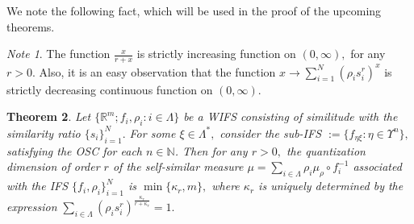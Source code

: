 \documentclass{amsproc}
\newtheorem{theorem}{Theorem}[section]
\theoremstyle{definition}
\theoremstyle{remark}
\newtheorem{note}[theorem]{Note}
\numberwithin{equation}{section}
\begin{document}
We note the following fact, which will be used in the proof of the upcoming theorems.
\begin{note}\label{mn1}
The function $\frac{x}{r+x}$ is strictly increasing function on $(0,\infty),$ for any $r>0.$ Also, it is an easy observation that the function $ x \to \sum_{i=1}^N (\rho_i s_i^r)^x$ is strictly decreasing continuous function on $(0,\infty).$
\end{note}
\begin{theorem}\label{mqd1}
Let $\{\mathbb{R}^m; f_{i},\rho_i: i \in \Lambda\}$ be a WIFS consisting of similitude with the similarity ratio $\{s_i\}_{i=1}^N.$ For some $\xi \in \Lambda^*,$ consider the sub-IFS $:= \{f_{ \eta \xi}: \eta \in \Upsilon^n \},$ satisfying the OSC for each $n \in \mathbb{N}$. Then for any $r>0,$ the quantization dimension of order $r$ of the self-similar measure $\mu = \sum_{i \in \Lambda} \rho_{i} \mu_{\rho} \circ f_{i}^{-1}$ associated with the IFS $\{f_{i},\rho_i\}_{i=1}^N$ is $\min\{\kappa_r,m\},$ where $\kappa_r$ is uniquely determined by the expression $\sum_{i \in \Lambda} (\rho_{i} s_{i}^r)^{\frac{\kappa_r}{r + \kappa_r}}= 1.$
\end{theorem}
\end{document}

